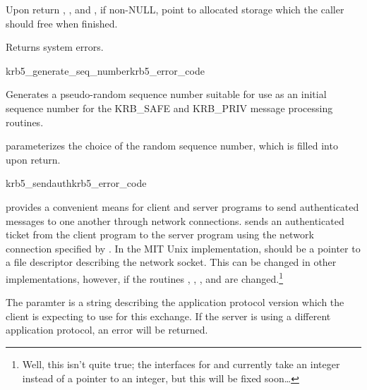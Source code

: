 Upon return ,
, and
, if non-NULL, point to allocated
storage which the caller should free when finished.

Returns system errors.

\begin{funcdecl}{krb5_generate_seq_number}{krb5_error_code}{\funcin}
\funcout
{}
\end{funcdecl}

Generates a pseudo-random sequence number suitable for use as an initial
sequence number for the KRB_SAFE and KRB_PRIV message processing
routines.

 parameterizes the choice of the random sequence number,
which is filled into  upon return.

\begin{funcdecl}{krb5_sendauth}{krb5_error_code}
\funcin
{}
\funcinout
{}
\funcout
{}
\end{funcdecl}

 provides a convenient means for client and
server programs to send authenticated messages to one another through
network connections.   sends an authenticated
ticket from the client program to the server program using the network
connection specified by .  In the MIT Unix implementation,
 should be a pointer to a file descriptor describing the
network socket.  This can be changed in other implementations, however,
if the routines ,
, , and
 are changed.\footnote{Well, this isn't quite
true; the interfaces for  and
 currently take an integer instead of a pointer
to an integer, but this will be fixed soon\ldots}

The paramter  is a string describing the
application protocol version which the client is expecting to use for
this exchange.  If the server is using a different application protocol,
an error will be returned.

